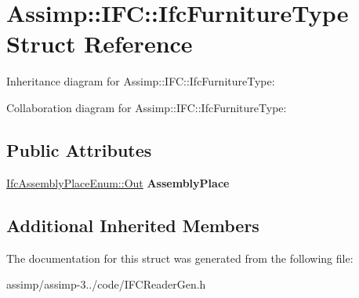 \hypertarget{struct_assimp_1_1_i_f_c_1_1_ifc_furniture_type}{\section{Assimp\+:\+:I\+F\+C\+:\+:Ifc\+Furniture\+Type Struct Reference}
\label{struct_assimp_1_1_i_f_c_1_1_ifc_furniture_type}
}


Inheritance diagram for Assimp\+:\+:I\+F\+C\+:\+:Ifc\+Furniture\+Type\+:


Collaboration diagram for Assimp\+:\+:I\+F\+C\+:\+:Ifc\+Furniture\+Type\+:
\subsection*{Public Attributes}
\begin{DoxyCompactItemize}
\item 
\hypertarget{struct_assimp_1_1_i_f_c_1_1_ifc_furniture_type_ac1ea308fb01ff508c50f1e94ba223974}{\hyperlink{classboost_1_1shared__ptr}{Ifc\+Assembly\+Place\+Enum\+::\+Out} {\bfseries Assembly\+Place}}\label{struct_assimp_1_1_i_f_c_1_1_ifc_furniture_type_ac1ea308fb01ff508c50f1e94ba223974}

\end{DoxyCompactItemize}
\subsection*{Additional Inherited Members}


The documentation for this struct was generated from the following file\+:\begin{DoxyCompactItemize}
\item 
assimp/assimp-\/3../code/I\+F\+C\+Reader\+Gen.\+h\end{DoxyCompactItemize}

